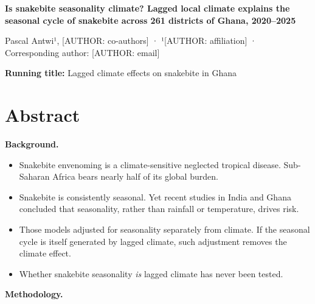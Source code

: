 \documentclass[11pt,a4paper]{article}
\providecommand{\tightlist}{\setlength{\itemsep}{0pt}\setlength{\parskip}{0pt}}
\begin{document}
\begin{flushleft}
{\Large\bfseries Is snakebite seasonality climate? Lagged local climate explains the seasonal cycle of snakebite across 261 districts of Ghana, 2020--2025\par}
\bigskip
Pascal Antwi¹, {[}AUTHOR: co-authors{]} · ¹{[}AUTHOR: affiliation{]} · Corresponding author: {[}AUTHOR: email{]}\par
\medskip
\textbf{Running title:} Lagged climate effects on snakebite in Ghana
\end{flushleft}

\section*{Abstract}

\textbf{Background.}

\begin{itemize}
\tightlist
\item
  Snakebite envenoming is a climate-sensitive neglected tropical disease. Sub-Saharan Africa bears nearly half of its global burden.
\item
  Snakebite is consistently seasonal. Yet recent studies in India and Ghana concluded that seasonality, rather than rainfall or temperature, drives risk.
\item
  Those models adjusted for seasonality separately from climate. If the seasonal cycle is itself generated by lagged climate, such adjustment removes the climate effect.
\item
  Whether snakebite seasonality \emph{is} lagged climate has never been tested.
\end{itemize}

\textbf{Methodology.}
\end{document}
